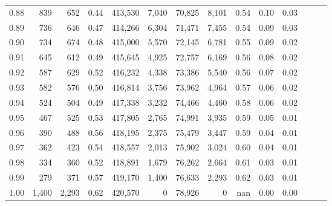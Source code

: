\begin{tabular}{rrrrrrrrrrrrrr}
0.88 &     839 &    652 &  0.44 &  413,530 &    7,040 &  70,825 &   8,101 &  0.54 &  0.10 &      0.03 \\
0.89 &     736 &    646 &  0.47 &  414,266 &    6,304 &  71,471 &   7,455 &  0.54 &  0.09 &      0.03 \\
0.90 &     734 &    674 &  0.48 &  415,000 &    5,570 &  72,145 &   6,781 &  0.55 &  0.09 &      0.02 \\
0.91 &     645 &    612 &  0.49 &  415,645 &    4,925 &  72,757 &   6,169 &  0.56 &  0.08 &      0.02 \\
0.92 &     587 &    629 &  0.52 &  416,232 &    4,338 &  73,386 &   5,540 &  0.56 &  0.07 &      0.02 \\
0.93 &     582 &    576 &  0.50 &  416,814 &    3,756 &  73,962 &   4,964 &  0.57 &  0.06 &      0.02 \\
0.94 &     524 &    504 &  0.49 &  417,338 &    3,232 &  74,466 &   4,460 &  0.58 &  0.06 &      0.02 \\
0.95 &     467 &    525 &  0.53 &  417,805 &    2,765 &  74,991 &   3,935 &  0.59 &  0.05 &      0.01 \\
0.96 &     390 &    488 &  0.56 &  418,195 &    2,375 &  75,479 &   3,447 &  0.59 &  0.04 &      0.01 \\
0.97 &     362 &    423 &  0.54 &  418,557 &    2,013 &  75,902 &   3,024 &  0.60 &  0.04 &      0.01 \\
0.98 &     334 &    360 &  0.52 &  418,891 &    1,679 &  76,262 &   2,664 &  0.61 &  0.03 &      0.01 \\
0.99 &     279 &    371 &  0.57 &  419,170 &    1,400 &  76,633 &   2,293 &  0.62 &  0.03 &      0.01 \\
1.00 &   1,400 &  2,293 &  0.62 &  420,570 &        0 &  78,926 &       0 &   nan &  0.00 &      0.00 \\
\bottomrule
\end{tabular}
